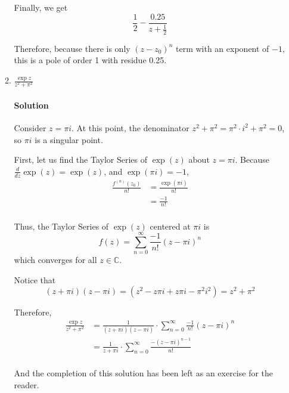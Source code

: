 \documentclass[11pt]{article}
\begin{document}
\begin{enumerate}
\begin{enumerate}
			Finally, we get
			\[\frac{1}{2} - \frac{0.25}{z + \frac{1}{2}}\]
			
			Therefore, because there is only $(z - z_0)^n$ term with an exponent of $-1$, this is a pole of order 1 with residue 0.25.
			
			\item $\frac{\exp{z}}{z^2 + \pi^2}$
			\paragraph{Solution}
			Consider $z = \pi i$. At this point, the denominator $z^2 + \pi^2 = \pi^2 \cdot i^2 + \pi^2 = 0$, so $\pi i$ is a singular point.
			
			\bigskip
			
			First, let us find the Taylor Series of $\exp(z)$ about $z = \pi i$. Because
			$\frac{d}{dz} \exp(z) = \exp(z)$, and $\exp(\pi i) = -1$,
			\[\begin{aligned}
			\frac{f^{(n)}(z_0)}{n!}
			&= \frac{\exp(\pi i)}{n!} \\
			&= \frac{-1}{n!} \\
			\end{aligned}\]
			
			Thus, the Taylor Series of $\exp(z)$ centered at $\pi i$ is 
			\[ f(z) = \sum^{\infty}_{n=0} \frac{-1}{n!} (z - \pi i)^n \]
			which converges for all $z \in \mathbb{C}$.
			
			Notice that 
			\[(z + \pi i)(z - \pi i)
			= (z^2 - z\pi i + z\pi i - \pi^2 i^2)
			= z^2 + \pi^2 \]
			
			Therefore,
			\[\begin{aligned}
			\frac{\exp{z}}{z^2 + \pi^2}
			&= \frac{1}{(z + \pi i)(z - \pi i)} \cdot 
				\sum^{\infty}_{n=0} \frac{-1}{n!} (z - \pi i)^n \\
			&= \frac{1}{z + \pi i} \cdot 
				\sum^{\infty}_{n=0} \frac{-(z - \pi i)^{n - 1}}{n!} \\
		    \end{aligned}\]
		    
		    And the completion of this solution has been left as an exercise for the reader.
		\end{enumerate}
\end{enumerate}
\end{document}
